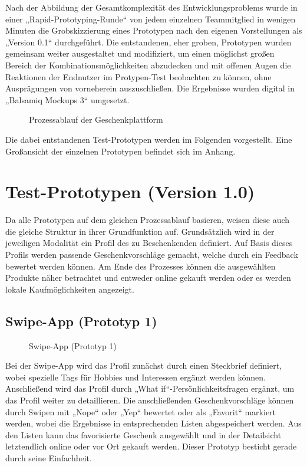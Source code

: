 \documentclass[12pt,ngerman, fleqn]{book} %
\begin{document}
Nach der Abbildung der Gesamtkomplexität des Entwicklungsproblems wurde in einer „Rapid-Prototyping-Runde“ von jedem einzelnen Teammitglied in wenigen Minuten die Grobskizzierung eines Prototypen nach den eigenen Vorstellungen als „Version 0.1“ durchgeführt. Die entstandenen, eher groben, Prototypen wurden gemeinsam weiter ausgestaltet und modifiziert, um einen möglichst großen Bereich der Kombinationsmöglichkeiten abzudecken und mit offenen Augen die Reaktionen der Endnutzer im Protypen-Test beobachten zu können, ohne Ausprägungen von vorneherein auszuschließen. Die Ergebnisse wurden digital in „Balsamiq Mockups 3“ umgesetzt.

\begin{figure}[ht]
    \centering
    \caption{Prozessablauf der Geschenkplattform}
    \label{fig:peter}
\end{figure}

Die dabei entstandenen Test-Prototypen werden im Folgenden vorgestellt. Eine Großansicht der einzelnen Prototypen befindet sich im Anhang. 

\section{Test-Prototypen (Version 1.0)}
Da alle Prototypen auf dem gleichen Prozessablauf basieren, weisen diese auch die gleiche Struktur in ihrer Grundfunktion auf. Grundsätzlich wird in der jeweiligen Modalität ein Profil des zu Beschenkenden definiert. Auf Basis dieses Profils werden passende Geschenkvorschläge gemacht, welche durch ein Feedback bewertet werden können. Am Ende des Prozesses können die ausgewählten Produkte näher betrachtet und entweder online gekauft werden oder es werden lokale Kaufmöglichkeiten angezeigt.

\subsection{Swipe-App (Prototyp 1)}
\begin{figure}[ht]
    \centering
    \caption{Swipe-App (Prototyp 1)}
    \label{fig:proto1}
\end{figure}

Bei der Swipe-App wird das Profil zunächst durch einen Steckbrief definiert, wobei spezielle Tags für Hobbies und Interessen ergänzt werden können. Anschließend wird das Profil durch „What if“-Persönlichkeitsfragen ergänzt, um das Profil weiter zu detaillieren. Die anschließenden Geschenkvorschläge können durch Swipen mit „Nope“ oder „Yep“ bewertet oder als „Favorit“ markiert werden, wobei die Ergebnisse in entsprechenden Listen abgespeichert werden. Aus den Listen kann das favorisierte Geschenk ausgewählt und in der Detailsicht letztendlich online oder vor Ort gekauft werden. Dieser Prototyp besticht gerade durch seine Einfachheit. 
\end{document}
